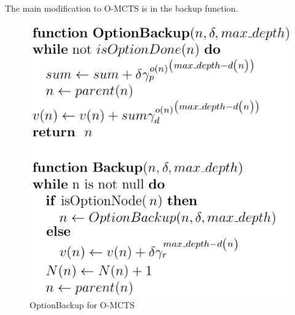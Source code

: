 \documentclass[12pt,a4paper]{article}
\begin{document}
\begin{multicols}{2}
The main modification to O-MCTS is in the backup function. 

\begin{figure}[H]
    \centering
    \includegraphics[width=\linewidth]{pseudocode.png}
    \caption{OptionBackup for O-MCTS}
\end{figure}


\end{multicols}
\end{document}
